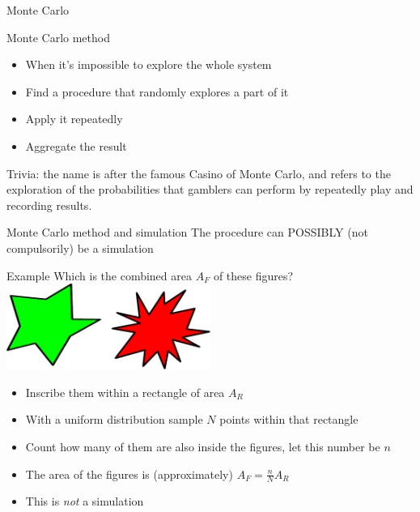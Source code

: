 \documentclass[presentation]{beamer}
\begin{document}
\begin{frame}{Monte Carlo}
 \begin{block}{Monte Carlo method}
  \begin{itemize}
        \item When it's impossible to explore the whole system
        \item Find a procedure that randomly explores a part of it
        \item Apply it repeatedly
        \item Aggregate the result
  \end{itemize}
 \end{block}
 Trivia: the name is after the famous Casino of Monte Carlo, and refers to the exploration of the probabilities that gamblers can perform by repeatedly play and recording results.
\end{frame}

\begin{frame}{Monte Carlo method and simulation}
	The procedure can POSSIBLY (not compulsorily) be a simulation
	\begin{block}{Example}
		Which is the combined area $A_F$ of these figures?
		\centering
		\includegraphics[width=0.5\textwidth]{img/mcmethod}
		\pause{}
		\begin{itemize}
			\item Inscribe them within a rectangle of area $A_R$
			\item With a uniform distribution sample $N$ points within that rectangle
			\item Count how many of them are also inside the figures, let this number be $n$
			\item The area of the figures is (approximately) $A_F = \frac{n}{N} A_R$
			\pause{}
			\item This is \emph{not} a simulation
		\end{itemize}
	\end{block}
\end{frame}
\end{document}
